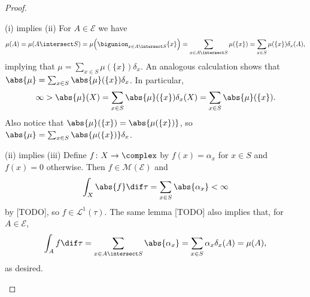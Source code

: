 \documentclass[article, a4paper, 11pt, oneside]{memoir}
\numberwithin{equation}{chapter}
\newcommand{\calE}{\mathcal{E}}
\newcommand{\calM}{\mathcal{M}}
\newcommand{\calL}{\mathcal{L}}
\begin{document}
\begin{proof}
\begin{proofsec}
    \item[(i) implies (ii)]
    For $A \in \calE$ we have
    \begin{equation*}
        \mu(A)
            = \mu(A \intersect S)
            = \mu \Bigl( \bigunion_{x \in A \intersect S} \{x\} \Bigr)
            = \sum_{x \in A \intersect S} \mu(\{x\})
            = \sum_{x \in S} \mu(\{x\}) \delta_x(A),
    \end{equation*}
    implying that $\mu = \sum_{x \in S} \mu(\{x\}) \delta_x$. An analogous calculation shows that $\abs{\mu} = \sum_{x \in S} \abs{\mu}(\{x\}) \delta_x$. In particular,
    \begin{equation*}
        \infty
            > \abs{\mu}(X)
            = \sum_{x \in S} \abs{\mu}(\{x\}) \delta_x(X)
            = \sum_{x \in S} \abs{\mu}(\{x\}).
    \end{equation*}
    Also notice that $\abs{\mu}(\{x\}) = \abs{\mu(\{x\})}$, so $\abs{\mu} = \sum_{x \in S} \abs{\mu(\{x\})} \delta_x$.

    \item[(ii) implies (iii)]
    Define $f \colon X \to \complex$ by $f(x) = \alpha_x$ for $x \in S$ and $f(x) = 0$ otherwise. Then $f \in \calM(\calE)$ and
    \begin{equation*}
        \int_X \abs{f} \dif\tau
            = \sum_{x \in S} \abs{\alpha_x}
            < \infty
    \end{equation*}
    by [TODO], so $f \in \calL^1(\tau)$. The same lemma [TODO] also implies that, for $A \in \calE$,
    \begin{equation*}
        \int_A f \dif\tau
            = \sum_{x \in A \intersect S} \abs{\alpha_x}
            = \sum_{x \in S} \alpha_x \delta_x(A)
            = \mu(A),
    \end{equation*}
    as desired.


\end{proofsec}
\end{proof}
\end{document}
